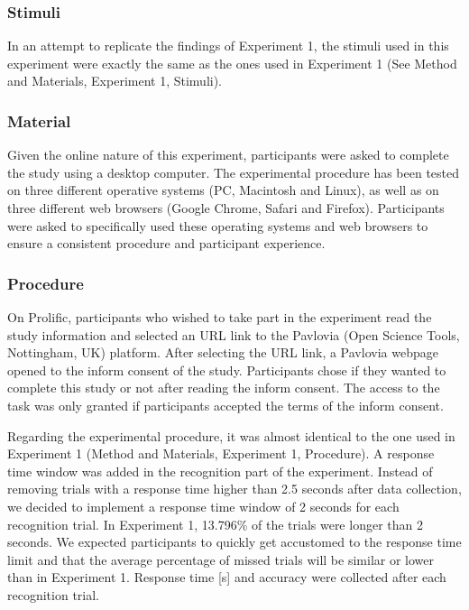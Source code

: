 \documentclass[
  letterpaper,
  DIV=11,
  numbers=noendperiod]{scrartcl}
\begin{document}
\subsubsection{Stimuli}\label{stimuli-1}

In an attempt to replicate the findings of Experiment 1, the stimuli
used in this experiment were exactly the same as the ones used in
Experiment 1 (See Method and Materials, Experiment 1, Stimuli).

\subsubsection{Material}\label{material-1}

Given the online nature of this experiment, participants were asked to
complete the study using a desktop computer. The experimental procedure
has been tested on three different operative systems (PC, Macintosh and
Linux), as well as on three different web browsers (Google Chrome,
Safari and Firefox). Participants were asked to specifically used these
operating systems and web browsers to ensure a consistent procedure and
participant experience.

\subsubsection{Procedure}\label{procedure-1}

On Prolific, participants who wished to take part in the experiment read
the study information and selected an URL link to the Pavlovia (Open
Science Tools, Nottingham, UK) platform. After selecting the URL link, a
Pavlovia webpage opened to the inform consent of the study. Participants
chose if they wanted to complete this study or not after reading the
inform consent. The access to the task was only granted if participants
accepted the terms of the inform consent.

Regarding the experimental procedure, it was almost identical to the one
used in Experiment 1 (Method and Materials, Experiment 1, Procedure). A
response time window was added in the recognition part of the
experiment. Instead of removing trials with a response time higher than
2.5 seconds after data collection, we decided to implement a response
time window of 2 seconds for each recognition trial. In Experiment 1,
13.796\% of the trials were longer than 2 seconds. We expected
participants to quickly get accustomed to the response time limit and
that the average percentage of missed trials will be similar or lower
than in Experiment 1. Response time {[}s{]} and accuracy were collected
after each recognition trial.
\end{document}
